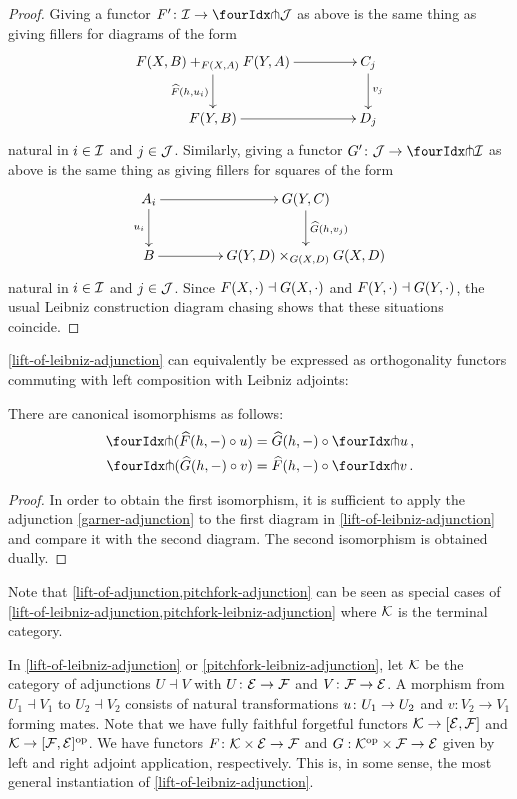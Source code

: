 \documentclass[reqno,10pt,a4paper,oneside,draft]{amsart}
\begin{document}
\begin{proof}
Giving a functor $F' \co \cal{I} \to \liftl{\cal{J}}$ as above is the same thing as giving fillers for diagrams of the form
\[
\xymatrix@C+2em{
  F(X,B) +_{F(X,A)} F(Y,A)
  \ar[d]_{\widehat{F}(h, u_i)}
  \ar[r]
&
  C_j
  \ar[d]^{v_j}
\\
  F(Y, B)
  \ar[r]
&
  D_j
}
\]
natural in $i \in \cal{I}$ and $j \in \cal{J}$.
Similarly, giving a functor $G' \co \cal{J} \to \liftl{\cal{I}}$ as above is the same thing as giving fillers for squares of the form
\[
\xymatrix@C+2em{
  A_i
  \ar[d]_{u_i}
  \ar[r]
&
  G(Y, C)
  \ar[d]^{\widehat{G}(h, v_j)}
\\
  B
  \ar[r]
&
  G(Y,D) \times_{G(X,D)} G(X,D)
}
\]
natural in $i \in \cal{I}$ and $j \in \cal{J}$.
Since $F(X, \arghole) \dashv G(X, \arghole)$ and $F(Y, \arghole) \dashv G(Y, \arghole)$, the usual Leibniz construction diagram chasing shows that these situations coincide.
\end{proof}

\cref{lift-of-leibniz-adjunction} can equivalently be expressed as orthogonality functors commuting with left composition with Leibniz adjoints:

\begin{corollary} \label{pitchfork-leibniz-adjunction} There are  canonical isomorphisms as follows:
\begin{align*}
  \liftr{(\widehat{F}(h, -) \cc u)} &= \widehat{G}(h, -) \cc \liftr{u}
\, ,\\
  \liftl{(\widehat{G}(h, -) \cc v)} &= \widehat{F}(h, -) \cc \liftl{v}
\, .
\end{align*}
\end{corollary}

\begin{proof}
In order to obtain the first isomorphism, it is sufficient to apply the adjunction \eqref{garner-adjunction} to the first diagram in \cref{lift-of-leibniz-adjunction} and compare it with the second diagram.
The second isomorphism is obtained dually.
\end{proof}

Note that \cref{lift-of-adjunction,pitchfork-adjunction} can be seen as special cases of \cref{lift-of-leibniz-adjunction,pitchfork-leibniz-adjunction} where $\cal{K}$ is the terminal category.

\begin{remark} \label{pitchfork-leibniz-most-general-example}
In \cref{lift-of-leibniz-adjunction} or \cref{pitchfork-leibniz-adjunction}, let $\cal{K}$ be the category of adjunctions $U \dashv V$ with $U 
\co \cal{E} \to \cal{F}$ and $V \co \cal{F} \to \cal{E}$.
A morphism from $U_1 \dashv V_1$ to $U_2 \dashv V_2$ consists of natural transformations $u \co U_1 \to U_2$ and $v : V_2 \to V_1$ forming mates.
Note that we have fully faithful forgetful functors $\cal{K} \to [\cal{E}, \cal{F}]$ and $\cal{K} \to [\cal{F}, \cal{E}]^{\op}$.
We have functors $F \co \cal{K} \times \cal{E} \to \cal{F}$ and $G : \cal{K}^{\op} \times \cal{F} \to \cal{E}$ given by left and right adjoint application, respectively.
This is, in some sense, the most general instantiation of \cref{lift-of-leibniz-adjunction}.
\end{remark}
\end{document}
